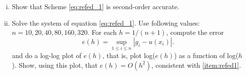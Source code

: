 \documentclass{ctexart}
\begin{document}
\begin{enumerate}[i)]
\begin{equation}
\begin{array}{rll}
			0 & , & otherwise. 
			\end{array}\right.
		\end{equation}
	\item Show that Scheme \eqref{eq:refed_1} is second-order accurate. \label{item:refed1}
	\item Solve the system of equation \eqref{eq:refed_1}. Use following values: $n=10, 20, 40, 80, 160, 320$. For each $h=1/(n+1)$, compute the error
		\begin{equation}
			e(h) = \sup_{1 \leqslant i \leqslant n} |g_i-u(x_i)|.
		\end{equation}
	and do a log-log plot of $e(h)$, that is, plot log($e(h)$) as a function of log($h$). Show, using this plot, that $e(h)=O(h^2)$, consistent with \ref{item:refed1}.
\end{enumerate}
\end{document}
